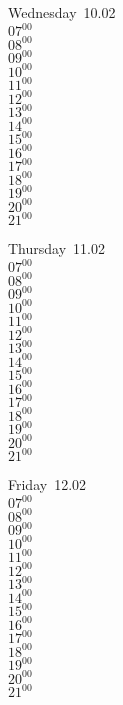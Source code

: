 \documentclass[11pt,a4paper]{book}\usepackage[]{graphicx}\usepackage[]{color}
\begin{document}
\begin{weekdaybox}
  Wednesday~10.02\\
  { 
  \vfill
  $07^{00}$\\
$08^{00}$\\
$09^{00}$\\
$10^{00}$\\
$11^{00}$\\
$12^{00}$\\
$13^{00}$\\
$14^{00}$\\
$15^{00}$\\
$16^{00}$\\
$17^{00}$\\
$18^{00}$\\
$19^{00}$\\
$20^{00}$\\
$21^{00}$\\
  }
\end{weekdaybox}
\clearpage
\begin{headerbox}
\end{headerbox}
\begin{weekdaybox}
  Thursday~11.02\\
  { 
  \vfill
  $07^{00}$\\
$08^{00}$\\
$09^{00}$\\
$10^{00}$\\
$11^{00}$\\
$12^{00}$\\
$13^{00}$\\
$14^{00}$\\
$15^{00}$\\
$16^{00}$\\
$17^{00}$\\
$18^{00}$\\
$19^{00}$\\
$20^{00}$\\
$21^{00}$\\
  }
\end{weekdaybox} 
\begin{weekdaybox}
  Friday~12.02\\
  { 
  \vfill
  $07^{00}$\\
$08^{00}$\\
$09^{00}$\\
$10^{00}$\\
$11^{00}$\\
$12^{00}$\\
$13^{00}$\\
$14^{00}$\\
$15^{00}$\\
$16^{00}$\\
$17^{00}$\\
$18^{00}$\\
$19^{00}$\\
$20^{00}$\\
$21^{00}$\\
  }
\end{weekdaybox}
\end{document}
